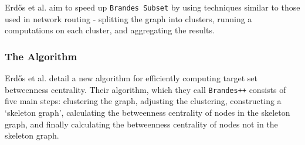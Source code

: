 \documentclass[12pt,a4paper,twoside,openright]{report}
\newcommand{\ttt}[1]{\texttt{#1}}
\newcommand{\erdos}{Erd\H{o}s }
\begin{document}
	
	\erdos et al. aim to speed up \ttt{Brandes Subset} by using techniques similar to those used in network routing - splitting the graph into clusters, running a computations on each cluster, and aggregating the results.
	
	\subsubsection{The Algorithm}
	
	\erdos et al. detail a new algorithm for efficiently computing target set betweenness centrality. Their algorithm, which they call \ttt{Brandes++} consists of five main steps: clustering the graph, adjusting the clustering, constructing a `skeleton graph', calculating the betweenness centrality of nodes in the skeleton graph, and finally calculating the betweenness centrality of nodes not in the skeleton graph.
	
\end{document}
